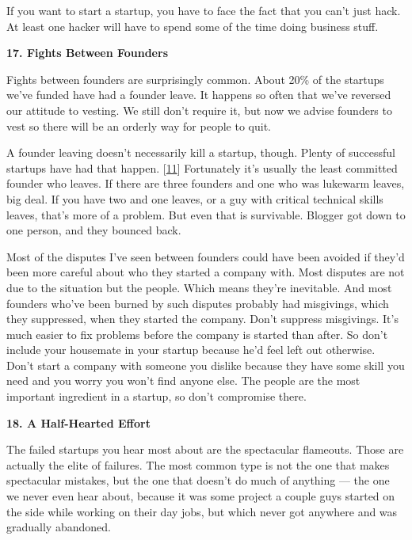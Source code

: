 If
                    you want to start a startup, you have to face the fact that
                    you can't just hack. At least one hacker will have to spend
                    some of the time doing business stuff.

\textbf{17. Fights Between Founders}

Fights between founders are surprisingly
                    common. About 20\% of the startups we've funded have had a
                    founder leave. It happens so often that we've reversed our
                    attitude to vesting. We still don't require it, but now we
                    advise founders to vest so there will be an orderly way for
                    people to quit.

A founder leaving doesn't
                    necessarily kill a startup, though. Plenty of successful
                    startups have had that happen.
                    [\href{\#f11n}{11}]
                    Fortunately it's usually the least committed founder who
                    leaves. If there are three founders and one who was lukewarm
                    leaves, big deal. If you have two and one leaves, or a guy
                    with critical technical skills leaves, that's more of a
                    problem. But even that is survivable. Blogger got down to
                    one person, and they bounced back.

Most of the
                    disputes I've seen between founders could have been avoided
                    if they'd been more careful about who they started a company
                    with. Most disputes are not due to the situation but the
                    people. Which means they're inevitable. And most founders
                    who've been burned by such disputes probably had misgivings,
                    which they suppressed, when they started the company. Don't
                    suppress misgivings. It's much easier to fix problems before
                    the company is started than after. So don't include your
                    housemate in your startup because he'd feel left out
                    otherwise. Don't start a company with someone you dislike
                    because they have some skill you need and you worry you
                    won't find anyone else. The people are the most important
                    ingredient in a startup, so don't compromise there.

\textbf{18. A Half-Hearted Effort}

The failed startups you hear most about are the
                    spectacular flameouts. Those are actually the elite of
                    failures. The most common type is not the one that makes
                    spectacular mistakes, but the one that doesn't do much of
                    anything --- the one we never even hear about, because
                    it was some project a couple guys started on the side while
                    working on their day jobs, but which never got anywhere and
                    was gradually abandoned.

